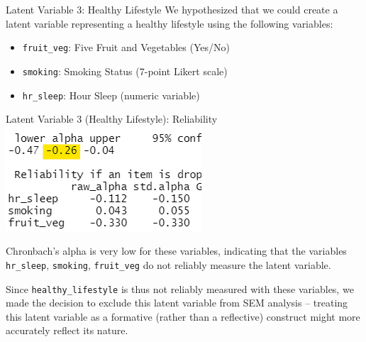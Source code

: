 \documentclass[
  ignorenonframetext,
]{beamer}
\begin{document}
\begin{frame}[fragile]{Latent Variable 3: Healthy Lifestyle}
\protect\hypertarget{latent-variable-3-healthy-lifestyle}{}
We hypothesized that we could create a latent variable representing a
healthy lifestyle using the following variables:

\begin{itemize}
\item
  \texttt{fruit\_veg}: Five Fruit and Vegetables (Yes/No)
\item
  \texttt{smoking}: Smoking Status (7-point Likert scale)
\item
  \texttt{hr\_sleep}: Hour Sleep (numeric variable)
\end{itemize}
\end{frame}

\begin{frame}[fragile]{Latent Variable 3 (Healthy Lifestyle):
Reliability}
\protect\hypertarget{latent-variable-3-healthy-lifestyle-reliability}{}
\includegraphics{images/health_alpha.png}

Chronbach's alpha is very low for these variables, indicating that the
variables \texttt{hr\_sleep}, \texttt{smoking}, \texttt{fruit\_veg} do
not reliably measure the latent variable.

Since \texttt{healthy\_lifestyle} is thus not reliably measured with
these variables, we made the decision to exclude this latent variable
from SEM analysis -- treating this latent variable as a formative
(rather than a reflective) construct might more accurately reflect its
nature.
\end{frame}
\end{document}
